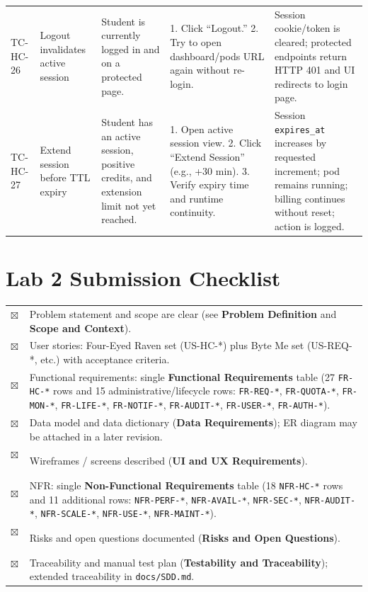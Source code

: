 \documentclass[12pt,a4paper]{article}
\newcommand{\cboxd}{\(\boxtimes\)\ }
\begin{document}
\begin{longtable}{@{}L{2cm}L{3cm}L{3cm}L{3.5cm}L{3cm}@{}}
    TC-HC-26 & Logout invalidates active session & Student is currently logged in and on a protected page. & 1. Click ``Logout.'' 2. Try to open dashboard/pods URL again without re-login. & Session cookie/token is cleared; protected endpoints return HTTP 401 and UI redirects to login page. \\
  TC-HC-27 & Extend session before TTL expiry & Student has an active session, positive credits, and extension limit not yet reached. & 1. Open active session view. 2. Click ``Extend Session'' (e.g., +30 min). 3. Verify expiry time and runtime continuity. & Session \texttt{expires\_at} increases by requested increment; pod remains running; billing continues without reset; action is logged. \\
\end{longtable}

\newpage
\section{Lab 2 Submission Checklist}

\begin{tabularx}{\textwidth}{@{}C{0.5cm}X@{}}
  \cboxd & Problem statement and scope are clear (see \textbf{Problem Definition} and \textbf{Scope and Context}). \\
  \cboxd & User stories: Four-Eyed Raven set (US-HC-*) plus Byte Me set (US-REQ-*, etc.) with acceptance criteria. \\
  \cboxd & Functional requirements: single \textbf{Functional Requirements} table (27 \texttt{FR-HC-*} rows and 15 administrative/lifecycle rows: \texttt{FR-REQ-*}, \texttt{FR-QUOTA-*}, \texttt{FR-MON-*}, \texttt{FR-LIFE-*}, \texttt{FR-NOTIF-*}, \texttt{FR-AUDIT-*}, \texttt{FR-USER-*}, \texttt{FR-AUTH-*}). \\
  \cboxd & Data model and data dictionary (\textbf{Data Requirements}); ER diagram may be attached in a later revision. \\
  \cboxd & Wireframes / screens described (\textbf{UI and UX Requirements}). \\
  \cboxd & NFR: single \textbf{Non-Functional Requirements} table (18 \texttt{NFR-HC-*} rows and 11 additional rows: \texttt{NFR-PERF-*}, \texttt{NFR-AVAIL-*}, \texttt{NFR-SEC-*}, \texttt{NFR-AUDIT-*}, \texttt{NFR-SCALE-*}, \texttt{NFR-USE-*}, \texttt{NFR-MAINT-*}). \\
  \cboxd & Risks and open questions documented (\textbf{Risks and Open Questions}). \\
  \cboxd & Traceability and manual test plan (\textbf{Testability and Traceability}); extended traceability in \texttt{docs/SDD.md}. \\
\end{tabularx}
\end{document}
